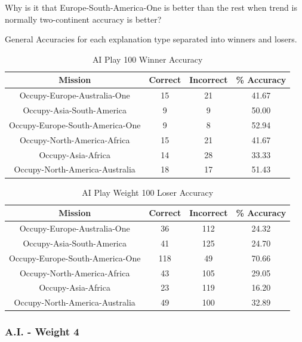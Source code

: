 \documentclass[parskip]{cs4rep}
\begin{document}
Why is it that Europe-South-America-One is better than the rest when trend is normally two-continent accuracy is better?

General Accuracies for each explanation type separated into winners and losers.

\begin{table}[ht]
\centering
\begin{tabular}{|c|c|c|c|}
\hline 
\textbf{Mission} & \textbf{Correct} & \textbf{Incorrect} & \textbf{\% Accuracy} \\ 
\hline 
Occupy-Europe-Australia-One & 15 & 21 & 41.67 \\  
\hline 
Occupy-Asia-South-America & 9 & 9 & 50.00 \\ 
\hline
Occupy-Europe-South-America-One & 9 & 8 & 52.94 \\
\hline
Occupy-North-America-Africa & 15 & 21 & 41.67 \\
\hline
Occupy-Asia-Africa & 14 & 28 & 33.33 \\
\hline
Occupy-North-America-Australia & 18 & 17 & 51.43 \\
\hline
\end{tabular}
\caption{AI Play 100 Winner Accuracy}
\label{table:ai-100-winner-accuracy}
\end{table}
			
\begin{table}[ht]
\centering
\begin{tabular}{|c|c|c|c|}
\hline 
\textbf{Mission} & \textbf{Correct} & \textbf{Incorrect} & \textbf{\% Accuracy} \\ 
\hline 
Occupy-Europe-Australia-One & 36 & 112 & 24.32 \\  
\hline 
Occupy-Asia-South-America & 41 & 125 & 24.70 \\ 
\hline
Occupy-Europe-South-America-One & 118 & 49 & 70.66 \\
\hline
Occupy-North-America-Africa & 43 & 105 & 29.05 \\
\hline
Occupy-Asia-Africa & 23 & 119 & 16.20 \\
\hline
Occupy-North-America-Australia & 49 & 100 & 32.89 \\
\hline
\end{tabular}
\caption{AI Play Weight 100 Loser Accuracy}
\label{table:ai-100-loser-accuracy}
\end{table}			

\newpage

\subsubsection{A.I. - Weight 4}
\end{document}
